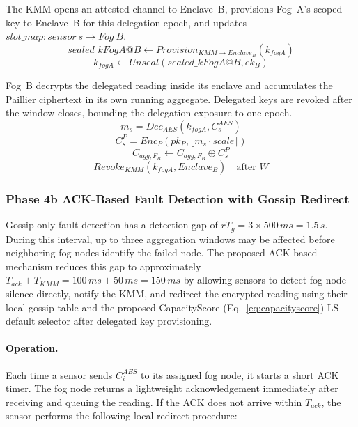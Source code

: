 \documentclass[conference]{IEEEtran}
\begin{document}
    The KMM opens an attested channel to Enclave~B, provisions Fog~A's scoped key to Enclave~B for this delegation epoch, and updates $slot\_map:sensor~s\rightarrow Fog~B$.
    \begin{equation}
    sealed\_kFogA@B \leftarrow Provision_{KMM\rightarrow Enclave_B}(k_{fogA})
    \end{equation}
    \begin{equation}
    k_{fogA} \leftarrow Unseal(sealed\_kFogA@B,ek_B)
    \end{equation}

    Fog~B decrypts the delegated reading inside its enclave and accumulates the Paillier ciphertext in its own running aggregate. Delegated keys are revoked after the window closes, bounding the delegation exposure to one epoch.
    \begin{equation}
    m_s = Dec_{AES}(k_{fogA}, C_s^{AES})
    \end{equation}
    \begin{equation}
    C_s^P = Enc_P(pk_P, \lfloor m_s \cdot scale \rceil)
    \end{equation}
    \begin{equation}
    C_{agg,F_B} \leftarrow C_{agg,F_B} \oplus C_s^P
    \end{equation}
    \begin{equation}
    Revoke_{KMM}(k_{fogA}, Enclave_B)\quad \text{after } W
    \end{equation}

    \subsubsection{\textbf{Phase 4b ACK-Based Fault Detection with Gossip Redirect}}

    Gossip-only fault detection has a detection gap of $rT_g=3\times 500\,ms=1.5\,s$. During this interval, up to three aggregation windows may be affected before neighboring fog nodes identify the failed node. The proposed ACK-based mechanism reduces this gap to approximately $T_{ack}+T_{KMM}=100\,ms+50\,ms=150\,ms$ by allowing sensors to detect fog-node silence directly, notify the KMM, and redirect the encrypted reading using their local gossip table and the proposed CapacityScore (Eq.~\eqref{eq:capacityscore}) LS-default selector after delegated key provisioning.

    \paragraph{Operation.}
    Each time a sensor sends $C_i^{AES}$ to its assigned fog node, it starts a short ACK timer. The fog node returns a lightweight acknowledgement immediately after receiving and queuing the reading. If the ACK does not arrive within $T_{ack}$, the sensor performs the following local redirect procedure:
\end{document}
